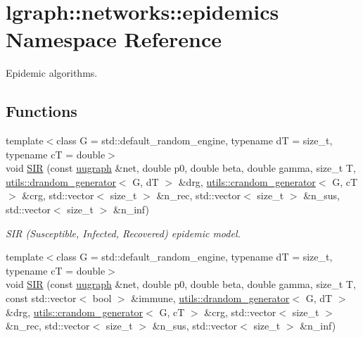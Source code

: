 \hypertarget{namespacelgraph_1_1networks_1_1epidemics}{\section{lgraph\-:\-:networks\-:\-:epidemics Namespace Reference}
\label{namespacelgraph_1_1networks_1_1epidemics}
}


Epidemic algorithms.  


\subsection*{Functions}
\begin{DoxyCompactItemize}
\item 
{\footnotesize template$<$class G  = std\-::default\-\_\-random\-\_\-engine, typename d\-T  = size\-\_\-t, typename c\-T  = double$>$ }\\void \hyperlink{namespacelgraph_1_1networks_1_1epidemics_ab3c20f0604bb3c45e501755d10e7c7b1}{S\-I\-R} (const \hyperlink{classlgraph_1_1uugraph}{uugraph} \&net, double p0, double beta, double gamma, size\-\_\-t T, \hyperlink{classlgraph_1_1utils_1_1drandom__generator}{utils\-::drandom\-\_\-generator}$<$ G, d\-T $>$ \&drg, \hyperlink{classlgraph_1_1utils_1_1crandom__generator}{utils\-::crandom\-\_\-generator}$<$ G, c\-T $>$ \&crg, std\-::vector$<$ size\-\_\-t $>$ \&n\-\_\-rec, std\-::vector$<$ size\-\_\-t $>$ \&n\-\_\-sus, std\-::vector$<$ size\-\_\-t $>$ \&n\-\_\-inf)
\begin{DoxyCompactList}\small\item\em S\-I\-R (Susceptible, Infected, Recovered) epidemic model. \end{DoxyCompactList}\item 
{\footnotesize template$<$class G  = std\-::default\-\_\-random\-\_\-engine, typename d\-T  = size\-\_\-t, typename c\-T  = double$>$ }\\void \hyperlink{namespacelgraph_1_1networks_1_1epidemics_af7c21ddb81d8637daacc904cd2eca4e8}{S\-I\-R} (const \hyperlink{classlgraph_1_1uugraph}{uugraph} \&net, double p0, double beta, double gamma, size\-\_\-t T, const std\-::vector$<$ bool $>$ \&immune, \hyperlink{classlgraph_1_1utils_1_1drandom__generator}{utils\-::drandom\-\_\-generator}$<$ G, d\-T $>$ \&drg, \hyperlink{classlgraph_1_1utils_1_1crandom__generator}{utils\-::crandom\-\_\-generator}$<$ G, c\-T $>$ \&crg, std\-::vector$<$ size\-\_\-t $>$ \&n\-\_\-rec, std\-::vector$<$ size\-\_\-t $>$ \&n\-\_\-sus, std\-::vector$<$ size\-\_\-t $>$ \&n\-\_\-inf)

\end{DoxyCompactItemize}
